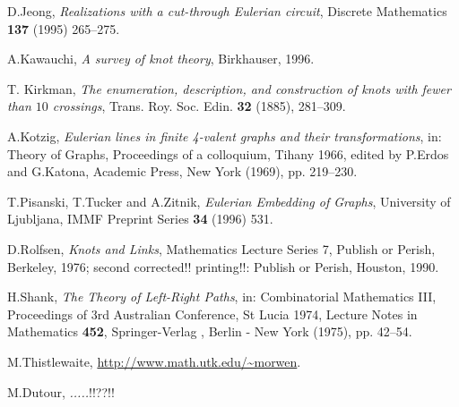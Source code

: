 \documentclass[12pt]{article}
\begin{document}
\begin{thebibliography}{99}
D.Jeong, {\em Realizations with a cut-through Eulerian circuit},
Discrete Mathematics {\bf 137} (1995) 265--275.



A.Kawauchi, {\em A survey of knot theory}, Birkhauser, 1996.

T. Kirkman, {\em The enumeration, description, and construction of knots with fewer than $10$ crossings}, Trans. Roy. Soc. Edin. {\bf 32} (1885), 281--309.


A.Kotzig, {\em Eulerian lines in finite 4-valent graphs and their 
transformations}, in: Theory of Graphs, Proceedings of a colloquium, 
Tihany 1966, edited by P.Erdos and G.Katona, Academic Press, 
New York (1969), pp. 219--230.


T.Pisanski, T.Tucker and A.Zitnik, {\em Eulerian Embedding of Graphs},
University of Ljubljana, IMMF Preprint Series {\bf 34}
(1996) 531.

D.Rolfsen, {\em Knots and Links}, Mathematics Lecture Series 7, Publish or
Perish, Berkeley, 1976;
second corrected!! printing!!: Publish or Perish, Houston, 1990.

H.Shank, {\em The Theory of Left-Right Paths}, in: Combinatorial 
Mathematics III,
Proceedings of 3rd Australian Conference, St Lucia 1974, Lecture Notes in
Mathematics {\bf 452}, Springer-Verlag , Berlin - New York (1975),  pp. 42--54.

M.Thistlewaite, \url{http://www.math.utk.edu/~morwen}.

M.Dutour, {\em .....}!!??!!



 
\end{thebibliography}
\end{document}
